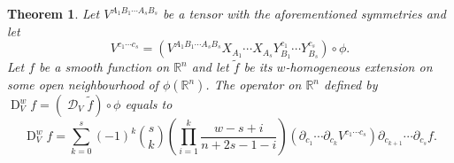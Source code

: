 \documentclass[final]{birkmult}
\newtheorem{theorem}{Theorem}[section]
\theoremstyle{definition}
\theoremstyle{remark}
\numberwithin{equation}{section}
\DeclareMathOperator{\D}{D}
\DeclareMathOperator{\aD}{\mathcal{D}}
\begin{document}
\begin{theorem}
        Let $V^{A_1 B_1 \cdots  A_s B_s}$ be a tensor with the aforementioned symmetries and let \[V^{c_1 \cdots c_s} = \left ( V^{A_1 B_1 \cdots  A_s B_s} X_{A_1} \cdots X_{A_s} Y_{B_1}^{c_1} \cdots Y_{B_s}^{c_s}\right ) \circ \phi.\] Let $f$ be a smooth function on $\mathbb{R}^n$ and let $\tilde{f}$ be its $w$\nobreakdash-homogeneous extension on some open neighbourhood of $\phi(\mathbb{R}^n)$. The operator on $\mathbb{R}^n$ defined by
\(\D^w_V f = (\aD_V \tilde{f})\circ \phi \)
equals to
        \begin{equation}\label{eq:res}
                \D^w_V f = \sum_{k=0}^s  (-1)^k{\textstyle \binom{s}{k}\left( \prod_{i=1}^k\frac{w-s+i}{n+2s-1-i}\right)} (\partial_{c_1}\cdots\partial_{c_k}V^{c_1 \cdots c_s})\partial_{c_{k+1}}\cdots \partial_{c_s}  f.
        \end{equation}
\end{theorem}
\end{document}
